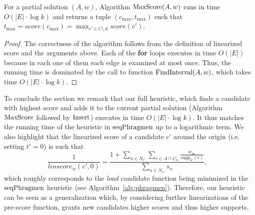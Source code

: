 \begin{lemma}\label{lem:maxscore}
For a partial solution $(A,w)$, Algorithm $\operatorname{MaxScore}(A,w)$ runs in time $O(|E|\cdot \log k)$ and returns a tuple $(c_{\max}, t_{\max})$ such that $t_{\max}=score(c_{\max})=\max_{c'\in C\setminus A} score(c')$.
\end{lemma}
\begin{proof}
The correctness of the algorithm follows from the definition of linearized score and the arguments above. Each of the \textbf{for} loops executes in time $O(|E|)$ because in each one of them each edge is examined at most once. Thus, the running time is dominated by the call to function $\operatorname{FindInterval}(A,w)$, which takes time $O(|E|\cdot \log k)$.
\end{proof}


To conclude the section we remark that our full heuristic, which finds a candidate with highest score and adds it to the current partial solution (Algorithm $\operatorname{MaxScore}$ followed by $\operatorname{Insert}$) executes in time $O(|E|\cdot \log k)$. It thus matches the running time of the heuristic in $\operatorname{seqPhragmen}$ up to a logarithmic term.
We also highlight that the linearized score of a candidate $c'$ around the origin (i.e. setting $t'=0$) is such that %
%
$$\frac{1}{linscore_w(c',0)}=\frac{1+\sum_{n\in N_{c'}} \sum_{c\in A\cap C_n} \frac{w_{nc}}{supp_w(c)}}{\sum_{n\in N_{c'}} s_n},$$
%
which roughly corresponds to the \emph{load} candidate function being minimized in the $\operatorname{seqPhragmen}$ heuristic (see Algorithm~\ref{alg:phragmen}). Therefore, our heuristic can be seen as a generalization which, by considering further linearizations of the pre-score function, grants new candidates higher scores and thus higher supports. 

